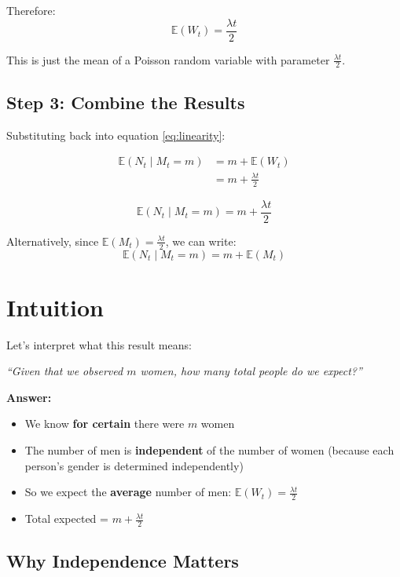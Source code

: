 \documentclass[11pt]{article}
\begin{document}
Therefore:
\[
\mathbb{E}(W_t) = \frac{\lambda t}{2}
\]

This is just the mean of a Poisson random variable with parameter $\frac{\lambda t}{2}$.

\subsection{Step 3: Combine the Results}

Substituting back into equation \eqref{eq:linearity}:

\begin{align*}
\mathbb{E}(N_t \mid M_t = m) &= m + \mathbb{E}(W_t) \\
&= m + \frac{\lambda t}{2}
\end{align*}

\begin{tcolorbox}[colback=yellow!10!white,colframe=orange!75!black,title=Final Answer]
\[
\boxed{\mathbb{E}(N_t \mid M_t = m) = m + \frac{\lambda t}{2}}
\]
\end{tcolorbox}

Alternatively, since $\mathbb{E}(M_t) = \frac{\lambda t}{2}$, we can write:
\[
\boxed{\mathbb{E}(N_t \mid M_t = m) = m + \mathbb{E}(M_t)}
\]

\section{Intuition}

Let's interpret what this result means:

\begin{center}
\textit{``Given that we observed $m$ women, how many total people do we expect?''}
\end{center}

\textbf{Answer:}
\begin{itemize}
    \item We know \textbf{for certain} there were $m$ women
    \item The number of men is \textbf{independent} of the number of women (because each person's gender is determined independently)
    \item So we expect the \textbf{average} number of men: $\mathbb{E}(W_t) = \frac{\lambda t}{2}$
    \item Total expected = $m + \frac{\lambda t}{2}$
\end{itemize}

\subsection{Why Independence Matters}
\end{document}
